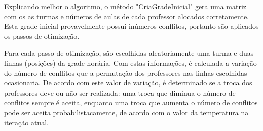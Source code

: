 Explicando melhor o algoritmo, o método "CriaGradeInicial" gera uma matriz com os as turmas e números de aulas de cada professor alocados corretamente. Esta grade inicial provavelmente possui inúmeros conflitos, portanto são aplicados os passos de otimização. 

Para cada passo de otimização, são escolhidas aleatoriamente uma turma e duas linhas (posições) da grade horária. Com estas informações, é calculada a variação do número de conflitos que a permutação dos professores nas linhas escolhidas ocasionaria. De acordo com este valor de variação, é determinado se a troca dos professores deve ou não ser realizada: uma troca que diminua o número de conflitos sempre é aceita, enquanto uma troca que aumenta o número de conflitos pode ser aceita probabilistacamente, de acordo com o valor da temperatura na iteração atual.


